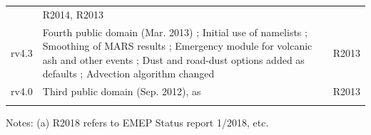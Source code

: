 \begin{table}
\begin{footnotesize}
\begin{tabular}{lp{11cm}l}
                  & R2014, R2013\\
rv4.3   & Fourth public domain (Mar. 2013)  %
       ; Initial use of namelists           %
       ; Smoothing of MARS results         %
       ; Emergency module for volcanic ash and other events%
       ; Dust and road-dust options added as defaults %
       ; Advection algorithm changed  %
             & R2013\\ 
rv4.0   & Third public domain (Sep. 2012), as \citet{Simpson:EMEP2012}            & R2013\\ 
        &                                                &\\
\hline
\end{tabular}
Notes: (a) R2018 refers to EMEP Status report 1/2018, etc.
\end{footnotesize}
\end{table}


\clearpage
\renewcommand\bibname{References}      %
%

